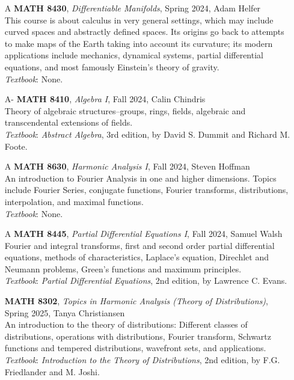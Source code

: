 \documentclass{article}
\begin{document}
\begin{enumerate}
    \item[A] \textbf{MATH 8430}, \textit{Differentiable Manifolds}, Spring 2024, Adam Helfer\\
    This course is about calculus in very general settings, which may include curved spaces and abstractly defined spaces. Its origins go back to attempts to make maps of the Earth taking into account its curvature; its modern applications include mechanics, dynamical systems, partial differential equations, and most famously Einstein's theory of gravity. \\
    \textit{Textbook}: None. 

    \item[A-] \textbf{MATH 8410}, \textit{Algebra I}, Fall 2024, Calin Chindris\\
    Theory of algebraic structures--groups, rings, fields, algebraic and transcendental extensions of fields. \\
    \textit{Textbook}: \textit{Abstract Algebra}, 3rd edition, by David S. Dummit and Richard M. Foote. 
    
    \item[A] \textbf{MATH 8630}, \textit{Harmonic Analysis I}, Fall 2024, Steven Hoffman \\
    An introduction to Fourier Analysis in one and higher dimensions. Topics include Fourier Series, conjugate functions, Fourier transforms, distributions, interpolation, and maximal functions. \\
    \textit{Textbook}: None.  

    \item[A] \textbf{MATH 8445}, \textit{Partial Differential Equations I}, Fall 2024, Samuel Walsh\\
    Fourier and integral transforms, first and second order partial differential equations, methods of characteristics, Laplace's equation, Direchlet and Neumann problems, Green's functions and maximum principles. \\
    \textit{Textbook}: \textit{Partial Differential Equations}, 2nd edition, by Lawrence C. Evans. 

    \item[] \textbf{MATH 8302}, \textit{Topics in Harmonic Analysis (Theory of Distributions)}, Spring 2025, Tanya Christiansen\\
    An introduction to the theory of distributions: Different classes of distributions, operations with distributions, Fourier transform, Schwartz functions and tempered distributions, wavefront sets, and applications. \\
    \textit{Textbook}: \textit{Introduction to the Theory of Distributions}, 2nd edition, by F.G. Friedlander and M. Joshi.
    

\end{enumerate}
\end{document}
